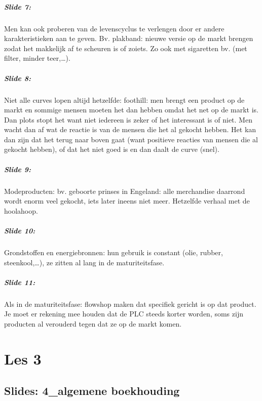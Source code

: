 \documentclass[10pt,a4paper]{report}
\begin{document}
\paragraph{Slide 7:} Men kan ook proberen van de levenscyclus te verlengen door er andere karakteristieken aan te geven. Bv. plakband: nieuwe versie op de markt brengen zodat het makkelijk af te scheuren is of zoiets. Zo ook met sigaretten bv. (met filter, minder teer,…).

\paragraph{Slide 8:} Niet alle curves lopen altijd hetzelfde: foothill: men brengt een product op de markt en sommige mensen moeten het dan hebben omdat het net op de markt is. Dan plots stopt het want niet iedereen is zeker of het interessant is of niet. Men wacht dan af wat de reactie is van de mensen die het al gekocht hebben. Het kan dan zijn dat het terug naar boven gaat (want positieve reacties van mensen die al gekocht hebben), of dat het niet goed is en dan daalt de curve (snel).

\paragraph{Slide 9:} Modeproducten: bv. geboorte prinses in Engeland: alle merchandise daarrond wordt enorm veel gekocht, iets later ineens niet meer. Hetzelfde verhaal met de hoolahoop.

\paragraph{Slide 10:} Grondstoffen en energiebronnen: hun gebruik is constant (olie, rubber, steenkool,…), ze zitten al lang in de maturiteitsfase.

\paragraph{Slide 11:} Als in de maturiteitsfase: flowshop maken dat specifiek gericht is op dat product. 
Je moet er rekening mee houden dat de PLC steeds korter worden, soms zijn producten al verouderd tegen dat ze op de markt komen.

\chapter{Les 3}

\section{Slides: 4\_algemene boekhouding} 
\end{document}
